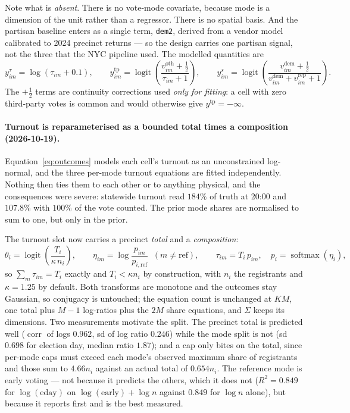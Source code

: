 \documentclass[11pt]{article}
\newcommand{\dem}{\mathrm{dem}}
\newcommand{\rep}{\mathrm{rep}}
\newcommand{\oth}{\mathrm{oth}}
\newcommand{\tp}{\mathrm{tp}}
\newcommand{\logit}{\operatorname{logit}}
\begin{document}
\noindent Note what is \emph{absent}. There is no vote-mode covariate, because mode is a
dimension of the unit rather than a regressor. There is no spatial basis. And the partisan
baseline enters as a single term, \texttt{dem2}, derived from a vendor model calibrated to
2024 precinct returns --- so the design carries one partisan signal, not the three that the
NYC pipeline used. The modelled quantities are
\begin{equation}
  y^{\tau}_{im} = \log(\tau_{im} + 0.1),
  \qquad
  y^{\tp}_{im} = \logit\!\left(\frac{v^{\oth}_{im} + \tfrac12}{\tau_{im} + 1}\right),
  \qquad
  y^{s}_{im}   = \logit\!\left(\frac{v^{\dem}_{im} + \tfrac12}{v^{\dem}_{im}+v^{\rep}_{im} + 1}\right).
  \label{eq:outcomes}
\end{equation}
The $+\tfrac12$ terms are continuity corrections used \emph{only for fitting}: a cell with
zero third-party votes is common and would otherwise give $y^{\tp} = -\infty$.

\paragraph{Turnout is reparameterised as a bounded total times a composition
(2026-10-19).} Equation~\eqref{eq:outcomes} models each cell's turnout as an unconstrained
log-normal, and the three per-mode turnout equations are fitted independently. Nothing then
ties them to each other or to anything physical, and the consequences were severe:
statewide turnout read $184\%$ of truth at 20:00 and $107.8\%$ with $100\%$ of the vote
counted. The prior mode shares are normalised to sum to one, but only in the prior.

The turnout slot now carries a precinct \emph{total} and a \emph{composition}:
\begin{equation}
  \theta_i = \logit\!\left(\frac{T_i}{\kappa\, n_i}\right),
  \qquad
  \eta_{im} = \log\!\frac{p_{im}}{p_{i,\textrm{ref}}}\;\; (m \neq \textrm{ref}),
  \qquad
  \tau_{im} = T_i\,p_{im},
  \quad p_i = \operatorname{softmax}(\eta_i),
  \label{eq:compose}
\end{equation}
so $\sum_m \tau_{im} = T_i$ exactly and $T_i < \kappa n_i$ by construction, with $n_i$ the
registrants and $\kappa = 1.25$ by default. Both transforms are monotone and the outcomes
stay Gaussian, so conjugacy is untouched; the equation count is unchanged at $KM$, one
total plus $M-1$ log-ratios plus the $2M$ share equations, and $\Sigma$ keeps its
dimensions. Two measurements motivate the split. The precinct total is predicted well
($\operatorname{corr}$ of logs $0.962$, sd of log ratio $0.246$) while the mode split is
not (sd $0.698$ for election day, median ratio $1.87$); and a cap only bites on the total,
since per-mode caps must exceed each mode's observed maximum share of registrants and those
sum to $4.66 n_i$ against an actual total of $0.654 n_i$. The reference mode is early
voting --- not because it predicts the others, which it does not
($R^2 = 0.849$ for $\log(\textrm{eday})$ on $\log(\textrm{early}) + \log n$ against $0.849$
for $\log n$ alone), but because it reports first and is the best measured.
\end{document}
